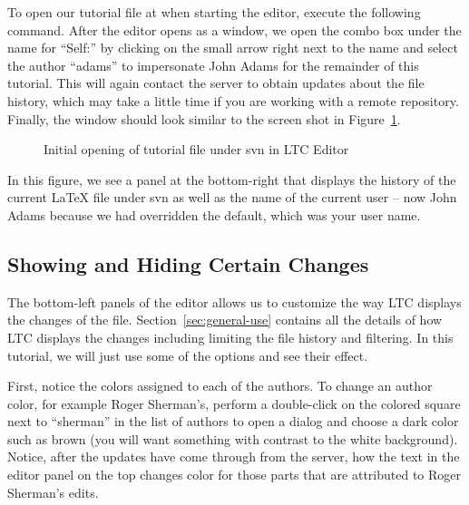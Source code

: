 To open our tutorial file at  when starting the editor, execute the following command.  After the editor opens as a window, we open the combo box under the name for ``Self:'' by clicking on the small arrow right next to the name and select the author ``adams'' to impersonate John Adams for the remainder of this tutorial.  This will again contact the server to obtain updates about the file history, which may take a little time if you are working with a remote repository.  Finally, the window should look similar to the screen shot in Figure~\ref{fig:svn-editor-open}.
\begin{figure}[t]
\centering
{}
\caption{Initial opening of tutorial file under svn in LTC Editor} \label{fig:svn-editor-open}
\end{figure}
In this figure, we see a panel at the bottom-right that displays the history of the current LaTeX file under svn as well as the name of the current user -- now John Adams because we had overridden the default, which was your user name.

\subsection{Showing and Hiding Certain Changes}

The bottom-left panels of the editor allows us to customize the way LTC displays the changes of the file.  Section~\ref{sec:general-use} contains all the details of how LTC displays the changes including limiting the file history and filtering.  In this tutorial, we will just use some of the options and see their effect.

First, notice the colors assigned to each of the authors.  To change an author color, for example Roger Sherman's,  perform a double-click on the colored square next to ``sherman'' in the list of authors to open a dialog and  choose a dark color such as brown (you will want something with contrast to the white background).  Notice, after the updates have come through from the server, how the text in the editor panel on the top changes color for those parts that are attributed to Roger Sherman's edits.

